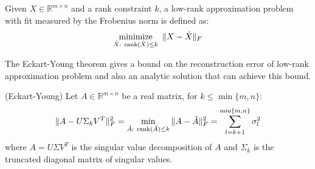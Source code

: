\documentclass[../main.tex]{subfiles}
\begin{document}
\begin{definition}
	Given $X\in \mathbb{R}^{m\times n}$ and a rank constraint $k$, a low-rank approximation problem with fit measured by the Frobenius norm is defined as:
	\begin{equation*}
	\mathop{{\rm minimize}}_{\hat{X}:\ {\rm rank}(\hat{X})\leq k}\ \|X-\hat{X}\|_F
	\end{equation*}
\end{definition}
\par The Eckart-Young theorem gives a bound on the reconstruction error of low-rank approximation problem and also an analytic solution that can achieve this bound.
\begin{theorem}\label{thm_1_EY}
	(Eckart-Young) Let $A\in \mathbb{R}^{m\times n}$ be a real matrix, for $k\leq \min\{m,n\}$:
	\begin{equation*}
	\|A-U\Sigma_kV^T\|_F^2 = \min_{\hat{A}:\ {\rm rank}(\hat{A})\leq k}\|A-\hat{A}\|^2_F = \sum_{l=k+1}^{\min\{m,n\}}\sigma_l^2 
	\end{equation*}
	where $A=U\Sigma V^T$ is the singular value decomposition of $A$ and $\Sigma_k$ is the truncated diagonal matrix of singular values.
\end{theorem}
\end{document}
